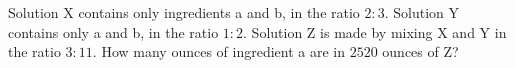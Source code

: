 Solution X contains only ingredients a and b, in the ratio $2:3$. Solution Y contains only a and b, in the ratio $1:2$. Solution Z is made by mixing X and Y in the ratio $3:11$. How many ounces of ingredient a are in $2520$ ounces of Z?
